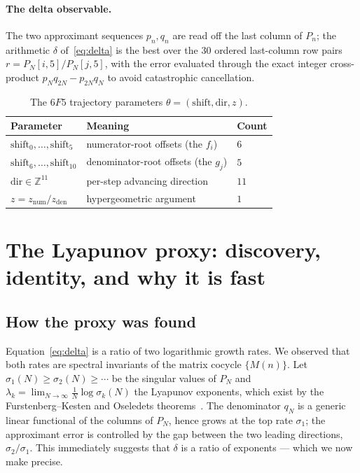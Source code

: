 \documentclass[11pt,a4paper]{article}
\theoremstyle{definition}
\newcommand{\Z}{\mathbb{Z}}
\begin{document}
\paragraph{The delta observable.} The two approximant sequences $p_n,q_n$ are read off the last
column of $P_n$; the arithmetic $\delta$ of~\eqref{eq:delta} is the best over the $30$ ordered
last-column row pairs $r=P_N[i,5]/P_N[j,5]$, with the error evaluated through the exact integer
cross-product $p_N q_{2N}-p_{2N}q_N$ to avoid catastrophic cancellation.

\begin{table}[t]\centering
\caption{The $6F5$ trajectory parameters $\theta=(\mathrm{shift},\mathrm{dir},z)$.}
\label{tab:params}
\begin{tabular}{lll}
\toprule
Parameter & Meaning & Count \\
\midrule
$\mathrm{shift}_0,\dots,\mathrm{shift}_5$ & numerator-root offsets (the $f_i$) & $6$ \\
$\mathrm{shift}_6,\dots,\mathrm{shift}_{10}$ & denominator-root offsets (the $g_j$) & $5$ \\
$\mathrm{dir}\in\Z^{11}$ & per-step advancing direction & $11$ \\
$z=z_{\mathrm{num}}/z_{\mathrm{den}}$ & hypergeometric argument & $1$ \\
\bottomrule
\end{tabular}
\end{table}

\section{The Lyapunov proxy: discovery, identity, and why it is fast}
\label{sec:proxy}

\subsection{How the proxy was found}
Equation~\eqref{eq:delta} is a ratio of two logarithmic growth rates. We observed that both
rates are spectral invariants of the matrix cocycle $\{M(n)\}$. Let $\sigma_1(N)\ge\sigma_2(N)
\ge\cdots$ be the singular values of $P_N$ and
$\lambda_k=\lim_{N\to\infty}\tfrac1N\log\sigma_k(N)$ the Lyapunov exponents, which exist by the
Furstenberg--Kesten and Oseledets theorems~\cite{furstenbergkesten1960,oseledets1968}. The
denominator $q_N$ is a generic linear functional of the columns of $P_N$, hence grows at the
top rate $\sigma_1$; the approximant error is controlled by the gap between the two leading
directions, $\sigma_2/\sigma_1$. This immediately suggests that $\delta$ is a ratio of
exponents --- which we now make precise.
\end{document}

